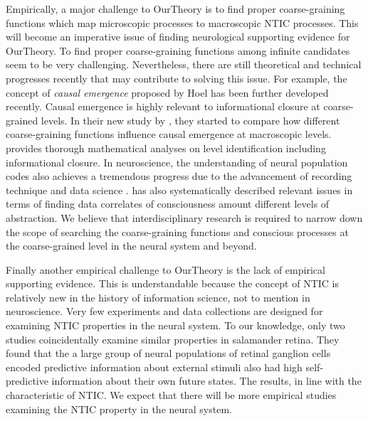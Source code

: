 \documentclass[utf8]{article}
\begin{document}
        
        Empirically, a major challenge to \ac{OurTheory} is to find proper coarse-graining functions which map microscopic processes to macroscopic NTIC processes. This will become an imperative issue of finding neurological supporting evidence for \ac{OurTheory}. To find proper coarse-graining functions among infinite candidates \citep{price2007causation} seem to be very challenging. Nevertheless, there are still theoretical and technical progresses recently that may contribute to  solving this issue. For example, the concept of \textit{causal emergence} proposed by Hoel \citep{Hoel19790, Hoel2018} has been further developed recently. Causal emergence is highly relevant to informational closure at coarse-grained levels. In their new study by \cite{klein2019uncertainty}, they started to compare how different coarse-graining functions influence causal emergence at macroscopic levels. \cite{PFANTE.2014, PFANTE.2014b} provides thorough mathematical analyses on level identification including informational closure. In neuroscience, the understanding of neural population codes also achieves a tremendous progress due to the advancement of recording technique and data science \citep{Kohn2016, panzeri2015neural}. \cite{Gamez2016} has also systematically described relevant issues in terms of finding data correlates of consciousness amount different levels of abstraction. We believe that interdisciplinary research is required to narrow down the scope of searching the coarse-graining functions and conscious processes at the coarse-grained level in the neural system and beyond. 
        
        Finally another empirical challenge to \ac{OurTheory} is the lack of empirical supporting evidence. This is understandable because the concept of NTIC is relatively new in the history of information science, not to mention in neuroscience. Very few experiments and data collections are designed for examining NTIC properties in the neural system. To our knowledge, only two studies \citep{Palmer2015, sederberg2018learning} coincidentally examine similar properties in salamander retina. They found that the a large group of neural populations of retinal ganglion cells encoded predictive information about external stimuli also had high self-predictive information about their own future states. The results, in line with the characteristic of NTIC. We expect that there will be more empirical studies examining the NTIC property in the neural system. 
\end{document}

